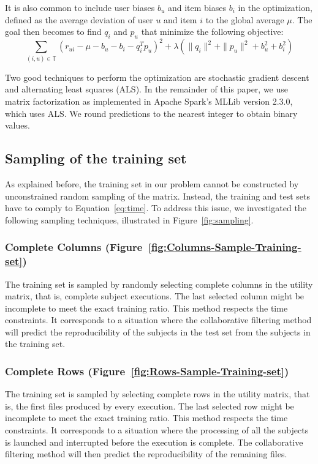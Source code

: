 \documentclass[10pt, conference, compsocconf]{IEEEtran}
\begin{document}
It is also common to include user biases $b_u$ and item biases $b_i$ in 
the optimization, defined as the average deviation of user $u$ and item 
$i$ to the global average $\mu$. The goal then becomes to find $q_i$ and $p_u$ that minimize the 
following objective:
\begin{equation*}
\sum_{(i,u) \in \mathbb{T}}\left( r_{ui} - \mu - b_u - b_i - q_i^Tp_u\right)^2+\lambda \left( \|{q_i}\|^2 + \|{p_u}\|^2 + b_u^2 + b_i^2\right)
\end{equation*}

Two good techniques to perform the optimization are stochastic gradient 
descent and alternating least squares (ALS). In the remainder of this 
paper, we use matrix factorization as implemented in Apache Spark's 
MLLib version 2.3.0, which uses ALS. We round predictions to the 
nearest integer to obtain binary values.


\subsection{Sampling of the training set}

\label{sec:training}

As explained before, the training set in our problem cannot be 
constructed by unconstrained random sampling of the matrix. Instead, 
the training and test sets have to comply to Equation~\ref{eq:time}. To 
address this issue, we investigated the following sampling techniques, illustrated in
Figure~\ref{fig:sampling}. 

\subsubsection{Complete Columns 
(Figure~\ref{fig:Columns-Sample-Training-set})} The training set is 
sampled by randomly selecting complete columns in the utility matrix, 
that is, complete subject executions. The last selected column might be 
incomplete to meet the exact training ratio. This method respects the 
time constraints. It corresponds to a situation where the collaborative 
filtering method will predict the reproducibility of the subjects in 
the test set from the subjects in the training set. 

\subsubsection{Complete Rows (Figure~\ref{fig:Rows-Sample-Training-set})} 
The training set is sampled by selecting complete rows in the utility 
matrix, that is, the first files produced by every execution. The last 
selected row might be incomplete to meet the exact training ratio. This 
method respects the time constraints. It corresponds to a situation 
where the processing of all the subjects is launched and interrupted 
before the execution is complete. The collaborative filtering method 
will then predict the reproducibility of the remaining files.
\end{document}
